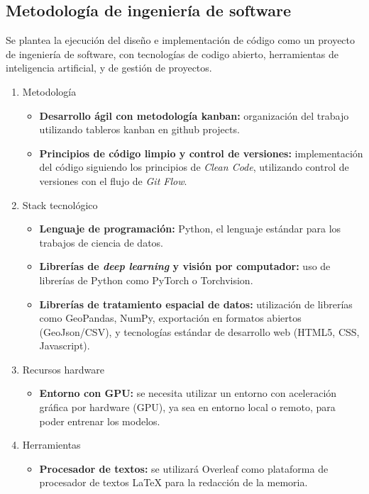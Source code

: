 \subsection{Metodología de ingeniería de software}
Se plantea la ejecución del diseño e implementación de código como un proyecto de ingeniería de software, con tecnologías de codigo abierto, herramientas de inteligencia artificial, y de gestión de proyectos.

\begin{enumerate}
    \item Metodología
        \begin{itemize}
            \item \textbf{Desarrollo ágil con metodología \gls{kanban}:} organización del trabajo utilizando tableros \gls{kanban} en \gls{github} projects.
            \item \textbf{Principios de código limpio y control de versiones:} implementación del código siguiendo los principios de \textit{Clean Code}, utilizando control de versiones con el flujo de \textit{Git Flow}.
        \end{itemize}
    \item Stack tecnológico
        \begin{itemize}
            \item \textbf{Lenguaje de programación:} Python, el lenguaje estándar para los trabajos de ciencia de datos.
            \item \textbf{Librerías de \textit{deep learning} y visión por computador:} uso de librerías de Python como PyTorch o Torchvision.
            \item \textbf{Librerías de tratamiento espacial de datos:} utilización de librerías como GeoPandas, NumPy, exportación en formatos abiertos (GeoJson/CSV), y tecnologías estándar de desarrollo web (HTML5, CSS, Javascript).
        \end{itemize}
    \item Recursos hardware
        \begin{itemize}
            \item \textbf{Entorno con \gls{GPU}:} se necesita utilizar un entorno con aceleración gráfica por hardware (\gls{GPU}), ya sea en entorno local o remoto, para poder entrenar los modelos.
        \end{itemize}
    \item Herramientas
        \begin{itemize}
            \item \textbf{Procesador de textos:} se utilizará Overleaf como plataforma de procesador de textos LaTeX para la redacción de la memoria.

\end{itemize}
\end{enumerate}
